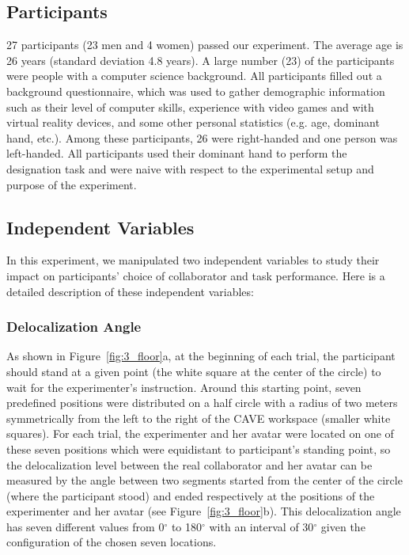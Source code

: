 \subsection{Participants}
27 participants (23 men and 4 women) passed our experiment. The average age is 26 years (standard deviation 4.8 years).
A large number (23) of the participants were people with a computer science background. All participants filled out a background questionnaire, which was used to gather demographic information such as their level of computer skills, experience with video games and with virtual reality devices, and some other personal statistics (e.g. age, dominant hand, etc.). Among these participants, 26 were right-handed and one person was left-handed. All participants used their dominant hand to perform the designation task and were naive with respect to the experimental setup and purpose of the experiment.


\subsection{Independent Variables}
In this experiment, we manipulated two independent variables to study their impact on participants' choice of collaborator and task performance. Here is a detailed description of these independent variables:

\subsubsection{Delocalization Angle}
As shown in Figure~\ref{fig:3_floor}a, at the beginning of each trial, the participant should stand at a given point (the white square at the center of the circle) to wait for the experimenter's instruction. Around this starting point, seven predefined positions were distributed on a half circle with a radius of two meters symmetrically from the left to the right of the CAVE workspace (smaller white squares). For each trial, the experimenter and her avatar were located on one of these seven positions which were equidistant to participant's standing point, so the delocalization level between the real collaborator and her avatar can be measured by the angle between two segments started from the center of the circle (where the participant stood) and ended respectively at the positions of the experimenter and her avatar (see Figure~\ref{fig:3_floor}b). This delocalization angle has seven different values from 0$^\circ$ to 180$^\circ$ with an interval of 30$^\circ$ given the configuration of the chosen seven locations.

